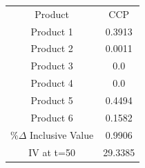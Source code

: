\begin{tabular}{cc}
Product & CCP \\
Product 1 & 0.3913 \\
Product 2 & 0.0011 \\
Product 3 & 0.0 \\
Product 4 & 0.0 \\
Product 5 & 0.4494 \\
Product 6 & 0.1582 \\
$\%\Delta$ Inclusive Value & 0.9906 \\
IV at t=50 & 29.3385 \\
\end{tabular}